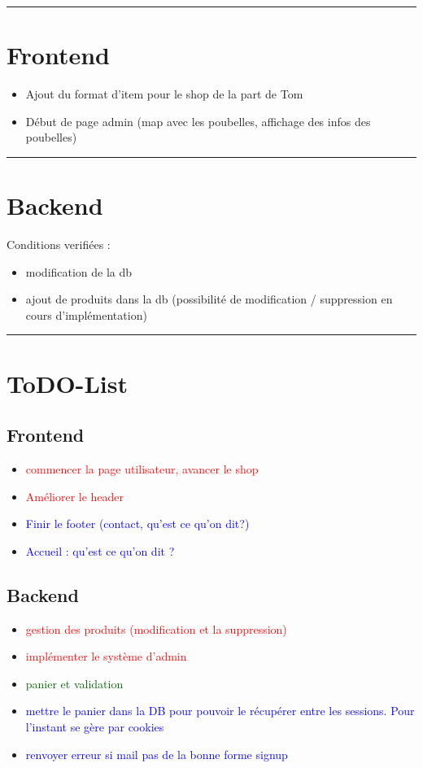 \documentclass[10pt,a4paper]{report}
\begin{document}
\noindent\rule{\linewidth}{0.5mm} \bigskip
\section{Frontend}
\begin{itemize}
        \item Ajout du format d’item pour le shop de la part de Tom
        \item Début de page admin (map avec les poubelles, affichage des infos des poubelles)
\end{itemize}


\noindent\rule{\linewidth}{0.5mm} \bigskip
\section{Backend}

\noindent Conditions verifiées :
\begin{itemize}
        \item modification de la db
        \item ajout de produits dans la db (possibilité de modification / suppression en cours d’implémentation)

\end{itemize}


\noindent\rule{\linewidth}{0.5mm} \bigskip
\section{ToDO-List}
\subsection*{Frontend}
\begin{itemize}
        \item \textcolor{red}{commencer la page utilisateur, avancer le shop}
        \item \textcolor{red}{Améliorer le header}
        \item \textcolor{blue}{Finir le footer (contact, qu’est ce qu’on dit?)}
        \item \textcolor{blue}{Accueil : qu’est ce qu’on dit ?}
\end{itemize}

\subsection*{Backend}
\begin{itemize}
        \item \textcolor{red}{gestion des produits (modification et la suppression)}
        \item \textcolor{red}{implémenter le système d’admin}
        \item \textcolor{darkgreen}{panier et validation}
        \item \textcolor{blue}{mettre le panier dans la DB pour pouvoir le récupérer entre les sessions. Pour l’instant se gère par cookies}
        \item \textcolor{blue}{renvoyer erreur si mail pas de la bonne forme signup}
\end{itemize}
\end{document}
